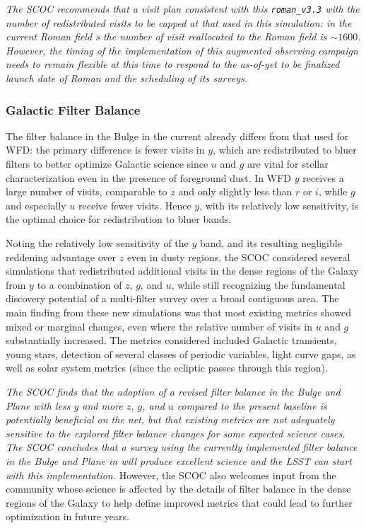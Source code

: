 {\it The SCOC recommends that a visit plan consistent with this \texttt{roman\_v3.3} with the number of redistributed visits to be capped at that used in this simulation: in the current Roman field \opsim s the number of visit reallocated to the Roman field is $\sim1600$. However, the timing of the implementation of this augmented observing campaign needs to remain flexible at this time to respond to the as-of-yet to be finalized launch date of Roman and the scheduling of its surveys.}


\subsubsection{Galactic Filter Balance}\label{sec:subG:filterbalance}

The filter balance in the Bulge in the current  already differs from that used for WFD: the primary difference is fewer visits in $y$, which are redistributed to bluer filters to better optimize Galactic science since $u$ and $g$ are vital for stellar characterization even in the presence of foreground dust. In WFD $y$ receives a large number of visits, comparable to $z$ and only slightly less than $r$ or $i$, while $g$ and especially $u$ receive fewer visits. Hence $y$, with its relatively low sensitivity, is the optimal choice for redistribution to bluer bands.

Noting the relatively low sensitivity of the $y$ band, and its resulting negligible reddening advantage over $z$ even in dusty regions, the SCOC considered several simulations that redistributed additional visits in the dense regions of the Galaxy from $y$ to a combination of $z$, $g$, and $u$, while still recognizing the fundamental discovery potential of a multi-filter survey over a broad contiguous area. The main finding from these new simulations was that most existing metrics showed mixed or marginal changes, even where the relative number of visits in $u$ and $g$ substantially increased. The metrics considered included Galactic transients, young stars, detection of several classes of periodic variables, light curve gaps, as well as solar system metrics (since the ecliptic passes through this region).

{\it The SCOC finds that the adoption of a revised filter balance in the Bulge and Plane with less $y$ and more $z$, $g$, and $u$ compared to the present baseline is potentially beneficial on the net, but that existing metrics are not adequately sensitive to the explored filter balance changes for some expected science cases. The SCOC concludes that a survey using the currently implemented filter balance in the Bulge and Plane in  will produce excellent science and the LSST can start with this implementation.} 
However, the SCOC also welcomes input from the community whose science is affected by the details of filter balance in the dense regions of the Galaxy to help define improved metrics that could lead to further optimization in future years.


